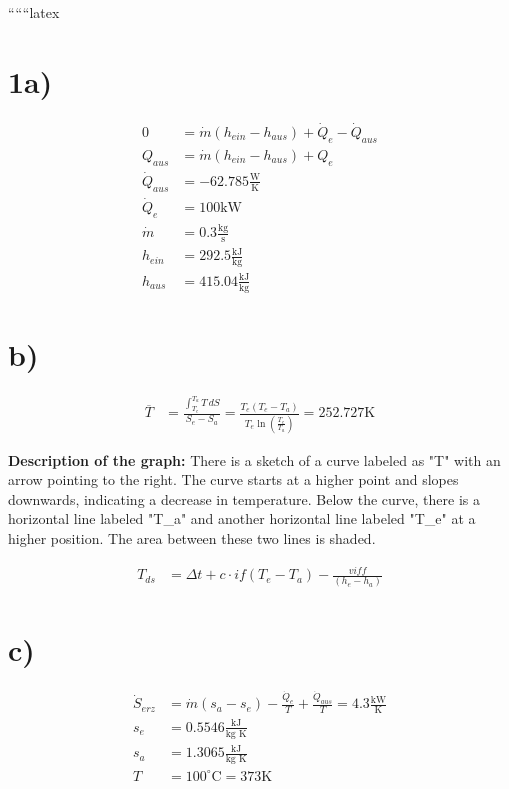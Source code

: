 
``````latex


\section*{1a)}
\begin{align*}
0 &= \dot{m}(h_{ein} - h_{aus}) + \dot{Q}_e - \dot{Q}_{aus} \\
Q_{aus} &= \dot{m}(h_{ein} - h_{aus}) + Q_e \\
\dot{Q}_{aus} &= -62.785 \frac{\text{W}}{\text{K}} \\
\dot{Q}_e &= 100 \text{kW} \\
\dot{m} &= 0.3 \frac{\text{kg}}{\text{s}} \\
h_{ein} &= 292.5 \frac{\text{kJ}}{\text{kg}} \\
h_{aus} &= 415.04 \frac{\text{kJ}}{\text{kg}}
\end{align*}

\section*{b)}
\begin{align*}
\overline{T} &= \frac{\int_{T_e}^{T_a} T \, dS}{S_e - S_a} = \frac{T_e (T_e - T_a)}{T_e \ln \left( \frac{T_e}{T_a} \right)} = 252.727 \text{K}
\end{align*}

\textbf{Description of the graph:} There is a sketch of a curve labeled as "T" with an arrow pointing to the right. The curve starts at a higher point and slopes downwards, indicating a decrease in temperature. Below the curve, there is a horizontal line labeled "T_a" and another horizontal line labeled "T_e" at a higher position. The area between these two lines is shaded.

\begin{align*}
T_{ds} &= \Delta t + c \cdot if(T_e - T_a) - \frac{viff}{(h_e - h_a)}
\end{align*}

\section*{c)}
\begin{align*}
\dot{S}_{erz} &= \dot{m} (s_a - s_e) - \frac{\dot{Q}_e}{T} + \frac{\dot{Q}_{aus}}{T} = 4.3 \frac{\text{kW}}{\text{K}} \\
s_e &= 0.5546 \frac{\text{kJ}}{\text{kg K}} \\
s_a &= 1.3065 \frac{\text{kJ}}{\text{kg K}} \\
T &= 100^\circ \text{C} = 373 \text{K}
\end{align*}

